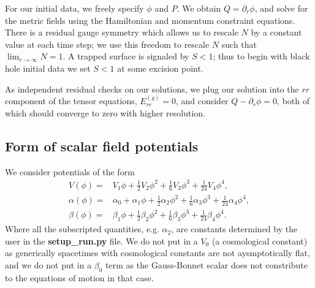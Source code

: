 \documentclass[a4paper,11pt]{article}
\begin{document}
   For our initial data, we freely specify $\phi$ and $P$.
We obtain $Q=\partial_r\phi$, and solve for the metric fields using
the Hamiltonian and momentum constraint equations.
There is a residual gauge symmetry which allows us
to rescale $N$ by a constant value at each time step;
we use this freedom to rescale $N$ such
that $\lim_{r\to\infty}N=1$.
A trapped surface is signaled by $S<1$;
thus to begin with black hole initial data we set $S<1$ at some
excision point.

   As independent residual checks on our solutions, we plug our
solution into the $rr$ component of the tensor equations, $E^{(g)}_{rr}=0$,
and consider $Q-\partial_r\phi=0$, both of which should converge
to zero with higher resolution.
\subsection{Form of scalar field potentials}
   We consider potentials of the form
\begin{subequations}
\begin{align}
   V\left(\phi\right)
   =&
   V_1\phi
+  \frac{1}{2}V_2\phi^2
+  \frac{1}{6}V_3\phi^3
+  \frac{1}{24}V_4\phi^4
   ,\\
   \alpha\left(\phi\right)
   =&
   \alpha_0
+  \alpha_1\phi
+  \frac{1}{2}\alpha_2\phi^2
+  \frac{1}{6}\alpha_3\phi^3
+  \frac{1}{24}\alpha_4\phi^4
   ,\\
   \beta\left(\phi\right)
   =&
   \beta_1\phi
+  \frac{1}{2}\beta_2\phi^2
+  \frac{1}{6}\beta_3\phi^3
+  \frac{1}{24}\beta_4\phi^4
   .
\end{align}
\end{subequations}
   Where all the subscripted quantities, e.g. $\alpha_2$, are constants
determined by the user in the {\bf setup\_run.py} file.
We do not put in a $V_0$ (a cosmological constant) as generically
spacetimes with cosmological constants are not aysmptotically flat,
and we do not put in a $\beta_0$ term as the Gauss-Bonnet scalar
does not constribute to the equations of motion in that case.






\end{document}
